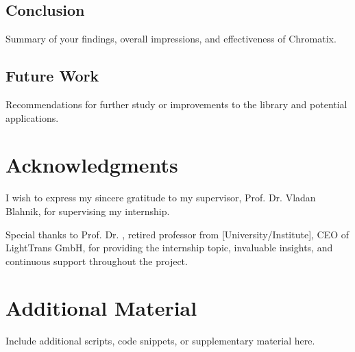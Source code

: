 \documentclass[a4paper,12pt]{report}
\begin{document}
\section{Conclusion}
Summary of your findings, overall impressions, and effectiveness of Chromatix.

\section{Future Work}
Recommendations for further study or improvements to the library and potential applications.

\chapter{Acknowledgments}
I wish to express my sincere gratitude to my supervisor, Prof. Dr. Vladan Blahnik, for supervising my internship. 

Special thanks to Prof. Dr. , retired professor from [University/Institute], CEO of LightTrans GmbH, for providing the internship topic, invaluable insights, and continuous support throughout the project. 






\appendix
\chapter{Additional Material}
Include additional scripts, code snippets, or supplementary material here.
\end{document}
